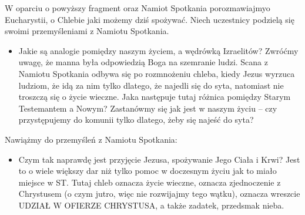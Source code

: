 \documentclass[a5paper,10pt,polish]{book}
\begin{document}
W oparciu o powyższy fragment oraz Namiot Spotkania porozmawiajmyo Eucharystii, o Chlebie jaki możemy dziś spożywać. Niech uczestnicy podzielą się swoimi przemyśleniami z Namiotu Spotkania.
\begin{itemize}
\item {} 
Jakie są analogie pomiędzy naszym życiem, a wędrówką Izraelitów? Zwróćmy uwagę, że manna była odpowiedzią Boga na szemranie ludzi. Scana z Namiotu Spotkania odbywa się po rozmnożeniu chleba, kiedy Jezus wyrzuca ludziom, że idą za nim tylko dlatego, że najedli się do syta, natomiast nie troszczą się o życie wieczne. Jaka następuje tutaj różnica pomiędzy Starym Testemantem a Nowym? Zastanówmy się jak jest w naszym życiu – czy przystępujemy do komunii tylko dlatego, żeby się najeść do syta?

\end{itemize}

Nawiążmy do przemyśleń z Namiotu Spotkania:
\begin{itemize}
\item {} 
Czym tak naprawdę jest przyjęcie Jezusa, spożywanie Jego Ciała i Krwi? Jest to o wiele większy dar niż tylko pomoc w doczesnym życiu jak to miało miejsce w ST. Tutaj chleb oznacza życie wieczne, oznacza zjednoczenie z Chrystusem (o czym jutro, więc nie rozwijajmy tego wątku), oznacza wreszcie UDZIAŁ W OFIERZE CHRYSTUSA, a także zadatek, przedsmak nieba.

\end{itemize}
\end{document}
